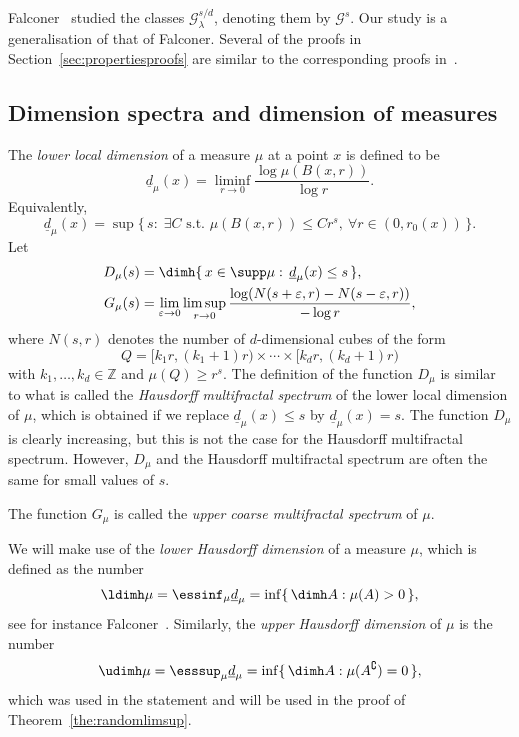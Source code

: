 Falconer~\cite{falconer1, falconer2} studied the classes $\mathscr{G}_\lambda^{s/d}$, denoting them by $\mathscr{G}^s$. Our study is a generalisation of that of Falconer. Several of the proofs in Section~\ref{sec:propertiesproofs} are similar to the corresponding proofs in~\cite{falconer2}.


\subsection{Dimension spectra and dimension of measures} \label{ssec:dimensiondefinitions}

The {\em lower local dimension} of a measure $\mu$ at a point $x$ is defined to be
\[
\underline{d}_\mu (x) = \liminf_{r \to 0} \frac{\log \mu (B(x,r))}{\log r}.
\]
Equivalently,
\[
\underline{d}_\mu (x) = \sup \{\, s :\; \exists C \text{ s.t. } \mu (B(x,r)) \leq C r^s, \ \forall r \in (0, r_0 (x)) \,\}.
\]
Let
\begin{align*}
D_\mu (s) &= \dimh \{\, x \in \supp \mu : \, \underline{d}_\mu (x)
\leq s \,\},\\
G_\mu (s) &= \lim_{\varepsilon \to 0} \limsup_{r \to 0} \frac{\log (N (s + \varepsilon, r) - N (s - \varepsilon, r))}{- \log r},
\end{align*}
where $N (s, r)$ denotes the number of $d$-dimensional cubes of the form
\[
Q = [k_1 r, (k_1+1) r) \times \cdots \times [k_d r, (k_d+1) r)
\]
with $k_1, \ldots, k_d \in \mathbb{Z}$ and $\mu (Q) \geq r^s$. The definition of the function $D_\mu$ is similar to what is called the
\emph{Hausdorff multifractal spectrum} of the lower local dimension of $\mu$, which is obtained if we replace $\underline{d}_\mu (x) \leq s$ by $\underline{d}_\mu (x) = s$. The function $D_\mu$ is clearly increasing, but this is not the case for the Hausdorff multifractal spectrum. However, $D_\mu$ and the Hausdorff multifractal spectrum are often the same for small values of $s$.

The function $G_\mu$ is called the \emph{upper coarse multifractal spectrum} of $\mu$.

We will make use of the {\em lower Hausdorff dimension} of a measure $\mu$, which is defined as the number
\[
\ldimh \mu = \essinf_{\mu} \underline{d}_\mu = \inf \{\, \dimh A :
\mu (A) > 0 \,\},
\]
see for instance Falconer~\cite[Proposition~10.2]{falconertechniques}. Similarly, the {\em upper Hausdorff dimension} of $\mu$ is the number
\[
\udimh \mu = \esssup_{\mu} \underline{d}_\mu = \inf \{\, \dimh A :
\mu (A^\complement) = 0 \,\},
\]
which was used in the statement and will be used in the proof of Theorem~\ref{the:randomlimsup}.

